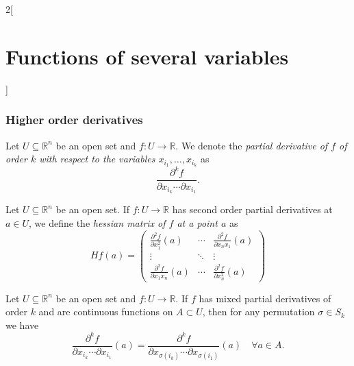 \documentclass[class=article,10pt,crop=false]{standalone}
\begin{document}
\begin{multicols}{2}[\section{Functions of several variables}]
\subsubsection{Higher order derivatives}
\begin{definition}
Let $U\subseteq\mathbb{R}^n$ be an open set and $f:U\rightarrow\mathbb{R}$. We denote the \textit{partial derivative of $f$ of order $k$ with respect to the variables $x_{i_1},\ldots,x_{i_k}$} as $$\frac{\partial^kf}{\partial x_{i_k}\cdots\partial x_{i_1}}.$$
\end{definition}
\begin{definition}
Let $U\subseteq\mathbb{R}^n$ be an open set. If $f:U\rightarrow\mathbb{R}$ has second order partial derivatives at $a\in U$, we define the \textit{hessian matrix of $f$ at a point $a$} as $$Hf(a)=\begin{pmatrix}
\displaystyle \frac{\partial^2 f}{\partial x_1^2}(a) &\cdots & \displaystyle \frac{\partial^2 f}{\partial x_nx_1}(a)\\
\vdots & \ddots & \vdots \\
\displaystyle \frac{\partial^2 f}{\partial x_1x_n}(a) & \cdots & \displaystyle \frac{\partial^2 f}{\partial x_n^2}(a)
\end{pmatrix}$$
\end{definition}
\begin{theorem}
Let $U\subseteq\mathbb{R}^n$ be an open set and $f:U\rightarrow\mathbb{R}$. If $f$ has mixed partial derivatives of order $k$ and are continuous functions on $A\subset U$, then for any permutation $\sigma\in S_k$ we have $$\frac{\partial^kf}{\partial x_{i_k}\cdots\partial x_{i_1}}(a)=\frac{\partial^kf}{\partial x_{\sigma(i_k)}\cdots\partial x_{\sigma(i_1)}}(a)\quad\forall a\in A.$$
\end{theorem}

\end{multicols}
\end{document}

